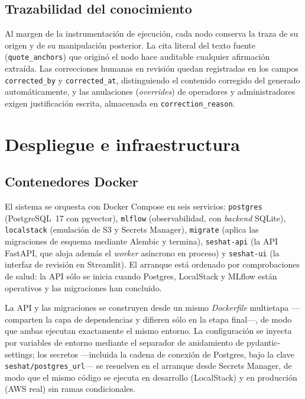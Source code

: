 \subsection{Trazabilidad del conocimiento}

Al margen de la instrumentación de ejecución, cada nodo conserva la traza de su origen y de su
manipulación posterior. La cita literal del texto fuente (\texttt{quote\_anchors}) que originó el
nodo hace auditable cualquier afirmación extraída. Las correcciones humanas en revisión quedan
registradas en los campos \texttt{corrected\_by} y \texttt{corrected\_at}, distinguiendo el
contenido corregido del generado automáticamente, y las anulaciones (\textit{overrides}) de
operadores y administradores exigen justificación escrita, almacenada en
\texttt{correction\_reason}.

\section{Despliegue e infraestructura}

\subsection{Contenedores Docker}

El sistema se orquesta con Docker Compose en seis servicios: \texttt{postgres}
(PostgreSQL~17 con pgvector), \texttt{mlflow} (observabilidad, con \textit{backend} SQLite),
\texttt{localstack} (emulación de S3 y Secrets Manager), \texttt{migrate} (aplica las migraciones
de esquema mediante Alembic y termina), \texttt{seshat-api} (la \ac{API} FastAPI, que aloja además el \textit{worker}
asíncrono en proceso) y \texttt{seshat-ui} (la interfaz de revisión en Streamlit). El arranque
está ordenado por comprobaciones de salud: la \ac{API} sólo se inicia cuando Postgres, LocalStack y
MLflow están operativos y las migraciones han concluido.

La \ac{API} y las migraciones se construyen desde un mismo \textit{Dockerfile} multietapa —comparten la
capa de dependencias y difieren sólo en la etapa final—, de modo que ambas ejecutan exactamente el
mismo entorno. La configuración se inyecta por variables de entorno mediante el separador de
anidamiento de pydantic-settings; los secretos —incluida la cadena de conexión de Postgres, bajo
la clave \texttt{seshat/postgres\_url}— se resuelven en el arranque desde Secrets Manager, de modo
que el mismo código se ejecuta en desarrollo (LocalStack) y en producción (AWS real) sin ramas
condicionales.

